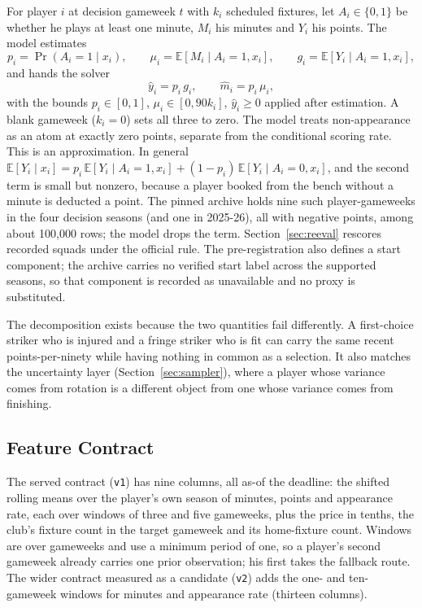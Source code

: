 \documentclass[11pt,a4paper]{article}
\begin{document}
For player $i$ at decision gameweek $t$ with $k_i$ scheduled fixtures, let $A_i \in \{0,1\}$ be whether he plays at least one minute, $M_i$ his minutes and $Y_i$ his points. The model estimates
\begin{equation}
p_i = \Pr(A_i = 1 \mid x_i),\qquad
\mu_i = \mathbb{E}[M_i \mid A_i = 1, x_i],\qquad
g_i = \mathbb{E}[Y_i \mid A_i = 1, x_i],
\end{equation}
and hands the solver
\begin{equation}
\hat y_i = p_i \, g_i, \qquad \hat m_i = p_i\,\mu_i,
\label{eq:compose}
\end{equation}
with the bounds $p_i \in [0,1]$, $\mu_i \in [0, 90k_i]$, $\hat y_i \ge 0$ applied after estimation. A blank gameweek ($k_i = 0$) sets all three to zero. The model treats non-appearance as an atom at exactly zero points, separate from the conditional scoring rate. This is an approximation. In general $\mathbb{E}[Y_i \mid x_i] = p_i\,\mathbb{E}[Y_i \mid A_i=1, x_i] + (1-p_i)\,\mathbb{E}[Y_i \mid A_i=0, x_i]$, and the second term is small but nonzero, because a player booked from the bench without a minute is deducted a point. The pinned archive holds nine such player-gameweeks in the four decision seasons (and one in 2025-26), all with negative points, among about 100{,}000 rows; the model drops the term. Section~\ref{sec:reeval} rescores recorded squads under the official rule. The pre-registration also defines a start component; the archive carries no verified start label across the supported seasons, so that component is recorded as unavailable and no proxy is substituted.

The decomposition exists because the two quantities fail differently. A first-choice striker who is injured and a fringe striker who is fit can carry the same recent points-per-ninety while having nothing in common as a selection. It also matches the uncertainty layer (Section~\ref{sec:sampler}), where a player whose variance comes from rotation is a different object from one whose variance comes from finishing.

\subsection{Feature Contract}

The served contract (\texttt{v1}) has nine columns, all as-of the deadline: the shifted rolling means over the player's own season of minutes, points and appearance rate, each over windows of three and five gameweeks, plus the price in tenths, the club's fixture count in the target gameweek and its home-fixture count. Windows are over gameweeks and use a minimum period of one, so a player's second gameweek already carries one prior observation; his first takes the fallback route. The wider contract measured as a candidate (\texttt{v2}) adds the one- and ten-gameweek windows for minutes and appearance rate (thirteen columns).
\end{document}
